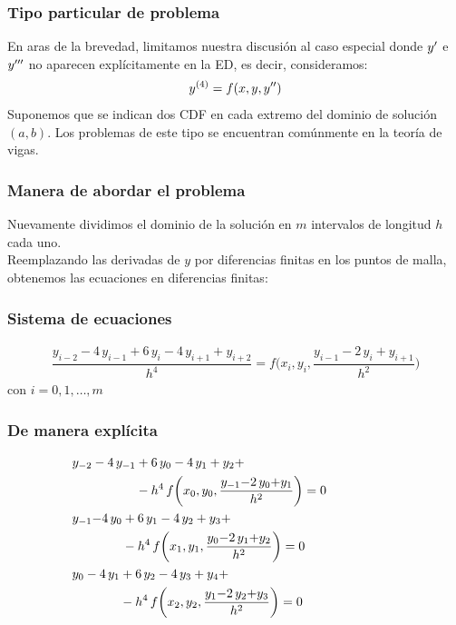 \documentclass[12pt]{beamer}
\begin{document}
\begin{frame}
\frametitle{Tipo particular de problema}
En aras de la brevedad, limitamos nuestra discusión al caso especial donde ${y}^{\prime}$ e ${y}^{\prime \prime \prime}$ no aparecen explícitamente en la ED, es decir, consideramos:
\pause
\begin{align*}
{y}^{(4)} = f (x, y, {y}^{\prime \prime})
\end{align*}
\pause 
Suponemos que se indican dos CDF en cada extremo del dominio de solución $(a, b)$. \pause Los problemas de este tipo se encuentran comúnmente en la teoría de vigas.
\end{frame}
\begin{frame}
\frametitle{Manera de abordar el problema}
Nuevamente dividimos el dominio de la solución en $m$ intervalos de longitud $h$ cada uno.
\\
\bigskip
\pause
Reemplazando las derivadas de $y$ por diferencias finitas en los puntos de malla, obtenemos las ecuaciones en diferencias finitas:
\end{frame}
\begin{frame}
\frametitle{Sistema de ecuaciones}
\begin{align}
\dfrac{y_{i-2} {-} 4 \, y_{i-1} {+} 6 \, y_{i} {-} 4 \, y_{i+1} {+} y_{i+2}}{h^{4}} = f \bigg( x_{i}, y_{i}, \dfrac{y_{i-1} {-} 2 \, y_{i} {+} y_{i+1}}{h^{2}} \bigg)
\label{eq:ecuacion_08_12}
\end{align}
con $i = 0, 1, \ldots, m$
\end{frame}
\begin{frame}
\frametitle{De manera explícita}
\begin{subequations}
\begin{align}
&{} \hspace*{-2cm} \begin{aligned}[b]
y_{-2} - 4 \, y_{-1} &+ 6 \, y_{0} - 4 \, y_{1} + y_{2} + \\
&- h^{4} \, f \bigg( x_{0}, y_{0}, \dfrac{y_{-1} {-} 2 \, y_{0} {+} y_{1}}{h^{2}} \bigg) = 0
\end{aligned}
\label{eq:ecuacion_08_13a} \\ 
&{} \hspace*{-2cm} \begin{aligned}[b]
y_{-1} {-} 4 \, y_{0} &+ 6 \, y_{1} - 4 \, y_{2} + y_{3} + \\
&- h^{4} \, f \bigg( x_{1}, y_{1}, \dfrac{y_{0} {-} 2 \, y_{1} {+} y_{2}}{h^{2}} \bigg) = 0
\end{aligned}
\label{eq:ecuacion_08_13b} \\ 
&{} \hspace*{-2cm} \begin{aligned}[b]
y_{0} - 4 \, y_{1} &+ 6 \, y_{2} - 4 \, y_{3} + y_{4} + \\
&- h^{4} \, f \bigg( x_{2}, y_{2}, \dfrac{y_{1} {-} 2 \, y_{2} {+} y_{3}}{h^{2}} \bigg) = 0
\end{aligned}
\label{eq:ecuacion_08_13c}
\end{align} 
\end{subequations}
\end{frame}
\end{document}
